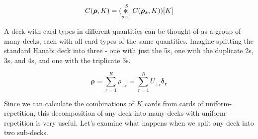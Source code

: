 \documentclass{article}
\newcommand{\Conv}{\mathop{\scalebox{1.5}{\raisebox{-0.2ex}{$\ast$}}}}%
\begin{document}
\begin{equation}
    C(\bm{\rho}, K) =  (\Conv_{s = 1}^S C(\bm{\rho_{s}}, K))[K]
\end{equation}

A deck with card types in different quantities can be thought of as a group of many decks, each with all card types of the same quantities. Imagine splitting the standard Hanabi deck into three - one with just the 5s, one with the duplicate 2s, 3s, and 4s, and one with the triplicate 3s.

\begin{equation}
    \bm{\rho} = \sum_{r = 1}^{R} \rho_{\bot_r} = \sum_{r = 1}^{R} U_{\bot_r} \bm{\delta_r}
\end{equation}

Since we can calculate the combinations of $K$ cards from cards of uniform-repetition, this decomposition of any deck into many decks with uniform-repetition is very useful. Let's examine what happens when we split any deck into two sub-decks.




\end{document}
